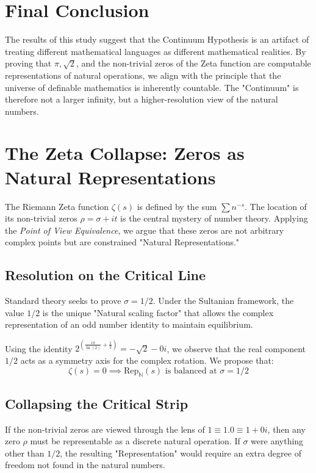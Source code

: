 \documentclass[12pt,a4paper]{article}
\begin{document}
\section{Final Conclusion}
The results of this study suggest that the Continuum Hypothesis is an artifact of treating different mathematical languages as different mathematical realities. By proving that $\pi, \sqrt{2}$, and the non-trivial zeros of the Zeta function are computable representations of natural operations, we align with the principle that the universe of definable mathematics is inherently countable. The "Continuum" is therefore not a larger infinity, but a higher-resolution view of the natural numbers.

\section{The Zeta Collapse: Zeros as Natural Representations}
The Riemann Zeta function $\zeta(s)$ is defined by the sum $\sum n^{-s}$. The location of its non-trivial zeros $\rho = \sigma + it$ is the central mystery of number theory. Applying the \textit{Point of View Equivalence}, we argue that these zeros are not arbitrary complex points but are constrained "Natural Representations."

\subsection{Resolution on the Critical Line}
Standard theory seeks to prove $\sigma = 1/2$. Under the Sultanian framework, the value $1/2$ is the unique "Natural scaling factor" that allows the complex representation of an odd number identity to maintain equilibrium. 

Using the identity $2^{\left(\frac{i \pi}{\ln(2)} + \frac{1}{2}\right)} = -\sqrt{2}-0i$, we observe that the real component $1/2$ acts as a symmetry axis for the complex rotation. We propose that:
\begin{equation}
    \zeta(s) = 0 \implies \text{Rep}_{\mathbb{N}}(s) \text{ is balanced at } \sigma = 1/2
\end{equation}

\subsection{Collapsing the Critical Strip}
If the non-trivial zeros are viewed through the lens of $1 \equiv 1.0 \equiv 1+0i$, then any zero $\rho$ must be representable as a discrete natural operation. If $\sigma$ were anything other than $1/2$, the resulting "Representation" would require an extra degree of freedom not found in the natural numbers. 
\end{document}
